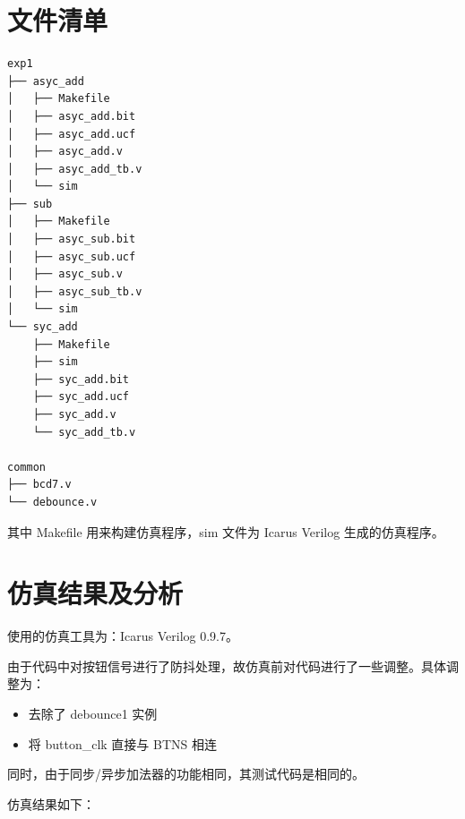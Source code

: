 \documentclass[11pt,a4paper]{article}
\begin{document}
\section{文件清单}

\begin{Verbatim}[fontsize=\scriptsize]
exp1
├── asyc_add
│   ├── Makefile
│   ├── asyc_add.bit
│   ├── asyc_add.ucf
│   ├── asyc_add.v
│   ├── asyc_add_tb.v
│   └── sim
├── sub
│   ├── Makefile
│   ├── asyc_sub.bit
│   ├── asyc_sub.ucf
│   ├── asyc_sub.v
│   ├── asyc_sub_tb.v
│   └── sim
└── syc_add
    ├── Makefile
    ├── sim
    ├── syc_add.bit
    ├── syc_add.ucf
    ├── syc_add.v
    └── syc_add_tb.v

common
├── bcd7.v
└── debounce.v
\end{Verbatim}

其中 Makefile 用来构建仿真程序，sim 文件为 Icarus Verilog 生成的仿真程序。


\section{仿真结果及分析}
使用的仿真工具为：Icarus Verilog 0.9.7。

由于代码中对按钮信号进行了防抖处理，故仿真前对代码进行了一些调整。具体调整为：

\begin{itemize}
  \item 去除了 debounce1 实例
  \item 将 button\_clk 直接与 BTNS 相连
\end{itemize}

同时，由于同步/异步加法器的功能相同，其测试代码是相同的。

仿真结果如下：
\end{document}
